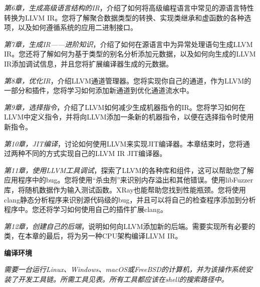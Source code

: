 \textit{第6章，生成高级语言结构的IR}，介绍了如何将高级编程语言中常见的源语言特性转换为LLVM IR。您将了解聚合数据类型的转换、实现类继承和虚函数的各种选项，以及如何遵循系统的应用二进制接口。\par

\textit{第7章，生成IR——进阶知识}，介绍了如何在源语言中为异常处理语句生成LLVM IR。您还将了解如何为基于类型的别名分析添加元数据，以及如何向生成的LLVM IR添加调试信息，并且您将扩展编译器生成的元数据。\par

\textit{第8章，优化IR}，介绍LLVM通道管理器。您将实现你自己的通道，作为LLVM的一部分和插件，您将学习如何添加新通道到优化通道流水中。\par

\textit{第9章，选择指令}，介绍了LLVM如何减少生成机器指令的IR。您将学习如何在LLVM中定义指令，并将向LLVM添加一条新的机器指令，以便在选择指令时使用新指令。\par

\textit{第10章，JIT编译}，讨论如何使用LLVM来实现JIT编译器。本章结束时，您将通过两种不同的方式实现自己的LLVM IR JIT编译器。\par

\textit{第11章，使用LLVM工具调试}，探索了LLVM的各种库和组件，这可以帮助您了解应用程序中的bug。您将使用“杀虫剂”来识别内存溢出和其他错误。使用libFuzzer库，将随机数据作为输入测试函数。XRay也能帮助您找到性能瓶颈。您将使用clang静态分析程序来识别源代码级的bug，并且可以将自己的检查程序添加到分析程序中。您还将学习如何使用自己的插件扩展clang。\par

\textit{第12章，创建自己的后端}，说明如何向LLVM添加新的后端。需要实现所有必要的类，在本章的最后，将为另一种CPU架构编译LLVM IR。\par

\hspace*{\fill} \par %
\textbf{编译环境}

\textit{需要一台运行Linux、Windows、macOS或FreeBSD的计算机，并为该操作系统安装了开发工具链。所需工具见表。所有工具都应该在shell的搜索路径中。}\par

